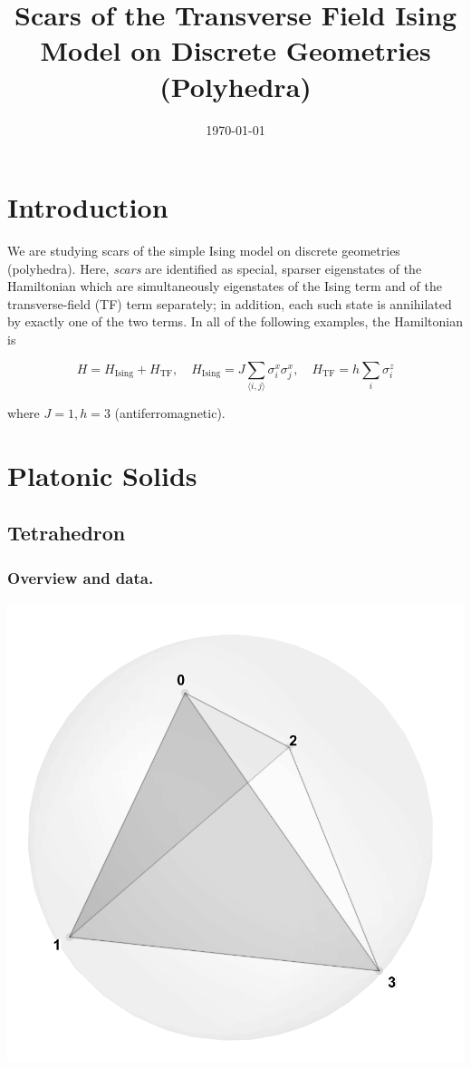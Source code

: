 \documentclass[11pt,a4paper]{article}
\title{Scars of the Transverse Field Ising Model on Discrete Geometries (Polyhedra)}
\author{}
\date{\today}
\newcommand{\Hising}{H_{\mathrm{Ising}}}
\newcommand{\Htf}{H_{\mathrm{TF}}}
\newcommand{\Htot}{H=\Hising+\Htf}
\begin{document}
\maketitle

\section*{Introduction}
We are studying scars of the simple Ising model on discrete geometries (polyhedra). Here, \emph{scars} are identified as special, sparser eigenstates of the Hamiltonian which are simultaneously eigenstates of the Ising term and of the transverse-field (TF) term separately; in addition, each such state is annihilated by exactly one of the two terms. In all of the following examples, the Hamiltonian is

\begin{equation}
\Htot, \quad \Hising = J \sum_{\langle i,j\rangle} \sigma_i^x \sigma_j^x, \quad  \Htf = h \sum_i \sigma_i^z
\end{equation}

where $J=1, h=3$ (antiferromagnetic).

\section*{Platonic Solids}

\subsection*{Tetrahedron}

\subsubsection*{Overview and data.}
\begin{center}
  \includegraphics[width=.6\linewidth]{tetrahedron}
\end{center}
\end{document}

